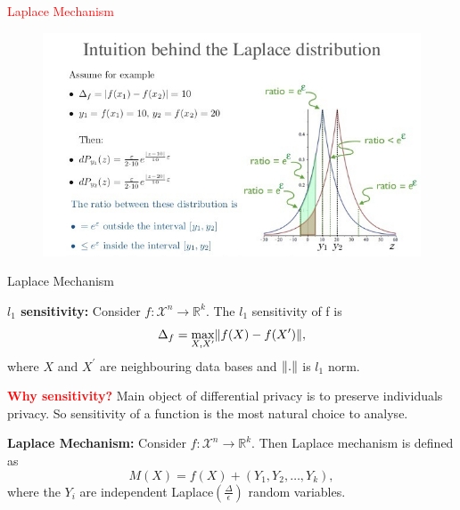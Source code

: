 \documentclass[aspectratio=169]{beamer}
\newcommand{\tcr}{\textcolor{red}}
\DeclarePairedDelimiter{\norm}{\lVert}{\rVert}
\begin{document}
\begin{frame}
\begin{center}
\Huge \tcr{Laplace Mechanism}
\end{center}
\begin{figure}[!ht]
        \centering
        \includegraphics[scale=0.5]{LaplaceIntution.jpg}
        \label{fig:lap}
\end{figure}
\end{frame}



\begin{frame}{Laplace Mechanism}
\begin{small}
\begin{definition}
\textbf{$l_1$ sensitivity: }Consider $f:\mathscr{X}^n \rightarrow \mathbb{R}^k$. The $l_1$ sensitivity of f is
$$\Delta_f= \max_{X, X^\prime} \norm{f(X)-f(X^\prime)},$$
where $X$ and $X^\prime$ are neighbouring data bases and $\norm{.}$ is $l_1$ norm.
\end{definition}
\pause

\tcr{\textbf{Why sensitivity?}}
\pause
Main object of differential privacy is to preserve individuals privacy. So sensitivity of a function is the most natural choice to analyse.\pause

\begin{definition}
\textbf{Laplace Mechanism: }Consider $f:\mathscr{X}^n \rightarrow \mathbb{R}^k$. Then Laplace mechanism is defined as
$$M(X)=f(X)+(Y_1,Y_2,\dots,Y_k),$$
where the $Y_i$ are independent Laplace$(\frac{\Delta}{\epsilon})$ random variables.
\end{definition}
\end{small}
\end{frame}
\end{document}
